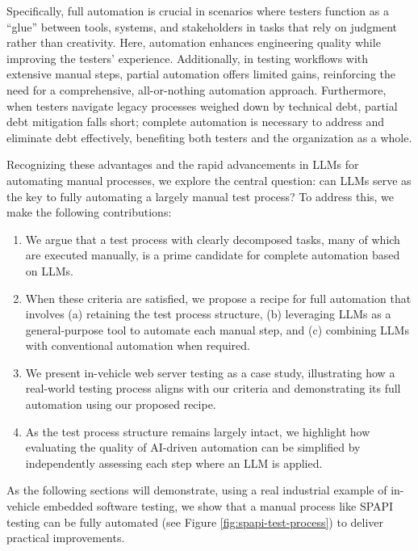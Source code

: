 Specifically, full automation is crucial in scenarios where testers function as a “glue” between tools, systems, and stakeholders in tasks that rely on judgment rather than creativity. Here, automation enhances engineering quality while improving the testers' experience. Additionally, in testing workflows with extensive manual steps, partial automation offers limited gains, reinforcing the need for a comprehensive, all-or-nothing automation approach. Furthermore, when testers navigate legacy processes weighed down by technical debt, partial debt mitigation falls short; complete automation is necessary to address and eliminate debt effectively, benefiting both testers and the organization as a whole.

Recognizing these advantages and the rapid advancements in LLMs for automating manual processes, we explore the central question: can LLMs serve as the key to fully automating a largely manual test process? To address this, we make the following contributions:

\begin{enumerate}
    \item We argue that a test process with clearly decomposed tasks, many of which are executed manually, is a prime candidate for complete automation based on LLMs.
    \item When these criteria are satisfied, we propose a recipe for full automation that involves (a) retaining the test process structure, (b) leveraging LLMs as a general-purpose tool to automate each manual step, and (c) combining LLMs with conventional automation when required.
    \item We present in-vehicle web server testing as a case study, illustrating how a real-world testing process aligns with our criteria and demonstrating its full automation using our proposed recipe.
    \item As the test process structure remains largely intact, we highlight how evaluating the quality of AI-driven automation can be simplified by independently assessing each step where an LLM is applied.
\end{enumerate}

As the following sections will demonstrate, using a real industrial example of in-vehicle embedded software testing, we show that a manual process like SPAPI testing can be fully automated (see Figure \ref{fig:spapi-test-process}) to deliver practical improvements.